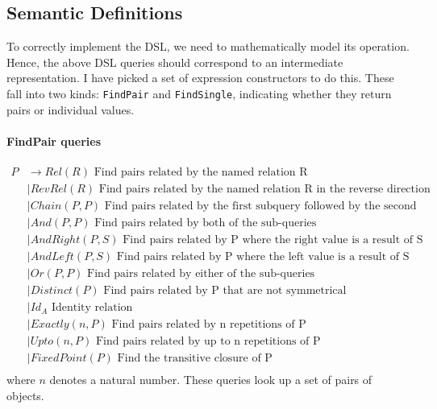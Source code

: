 \documentclass[12pt,a4paper,twoside,openright]{report}
\newcommand\codeName[1]{\texttt{#1}}
\begin{document}
\subsection{Semantic Definitions}\label{ADTDef}
To correctly implement the DSL, we need to mathematically model its operation. Hence, the above DSL queries should correspond to an intermediate representation. I have picked a set of expression constructors to do this. These fall into two kinds: \codeName{FindPair} and \codeName{FindSingle}, indicating whether they return pairs or individual values.

\paragraph{FindPair queries}
\begin{equation}
\label{PDefinition}
\begin{split}
P  &\rightarrow Rel(R) \mbox{ Find pairs related by the named relation R}\\
&\mid RevRel(R) \mbox{ Find pairs related by the named relation R in the reverse direction}\\
&\mid Chain(P, P) \mbox{   Find pairs related by the first subquery followed by the second}\\
&\mid And(P, P) \mbox{  Find pairs related by both of the sub-queries}\\
&\mid AndRight(P, S) \mbox{  Find pairs related by P where the right value is a result of S}\\
&\mid AndLeft(P, S) \mbox{  Find pairs related by P where the left value is a result of S}\\
&\mid Or(P, P) \mbox{  Find pairs related by either of the sub-queries}\\
&\mid Distinct(P) \mbox{  Find pairs related by P that are not symmetrical}\\
&\mid Id_A \mbox{ Identity relation}\\
&\mid Exactly(\mathit{n}, P) \mbox{  Find pairs related by n repetitions of P}\\
&\mid Upto(\mathit{n}, P) \mbox{  Find pairs related by up to n repetitions of P}\\
&\mid FixedPoint(P) \mbox{  Find the transitive closure of P}\\
\end{split}
\end{equation} 
where $n$ denotes a natural number. These queries look up a set of pairs of objects.\\
\end{document}
